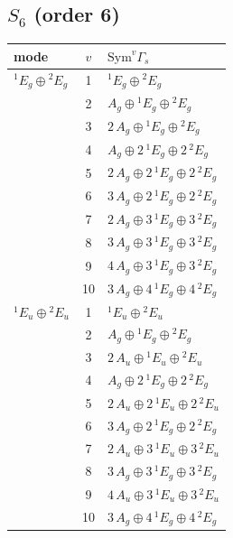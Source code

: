 \documentclass[11pt]{article}
\begin{document}
\subsection*{$S_{6}$ \quad (order 6)}
\begin{longtable}{l c p{}}
\hline mode & $v$ & $\mathrm{Sym}^v\Gamma_s$\\ \hline\endhead
${}^{1}E_{g}\oplus {}^{2}E_{g}$ & 1 & ${}^{1}E_{g}\oplus {}^{2}E_{g}$\\
 & 2 & $A_{g}\oplus {}^{1}E_{g}\oplus {}^{2}E_{g}$\\
 & 3 & $2\,A_{g}\oplus {}^{1}E_{g}\oplus {}^{2}E_{g}$\\
 & 4 & $A_{g}\oplus 2\,{}^{1}E_{g}\oplus 2\,{}^{2}E_{g}$\\
 & 5 & $2\,A_{g}\oplus 2\,{}^{1}E_{g}\oplus 2\,{}^{2}E_{g}$\\
 & 6 & $3\,A_{g}\oplus 2\,{}^{1}E_{g}\oplus 2\,{}^{2}E_{g}$\\
 & 7 & $2\,A_{g}\oplus 3\,{}^{1}E_{g}\oplus 3\,{}^{2}E_{g}$\\
 & 8 & $3\,A_{g}\oplus 3\,{}^{1}E_{g}\oplus 3\,{}^{2}E_{g}$\\
 & 9 & $4\,A_{g}\oplus 3\,{}^{1}E_{g}\oplus 3\,{}^{2}E_{g}$\\
 & 10 & $3\,A_{g}\oplus 4\,{}^{1}E_{g}\oplus 4\,{}^{2}E_{g}$\\
\hline
${}^{1}E_{u}\oplus {}^{2}E_{u}$ & 1 & ${}^{1}E_{u}\oplus {}^{2}E_{u}$\\
 & 2 & $A_{g}\oplus {}^{1}E_{g}\oplus {}^{2}E_{g}$\\
 & 3 & $2\,A_{u}\oplus {}^{1}E_{u}\oplus {}^{2}E_{u}$\\
 & 4 & $A_{g}\oplus 2\,{}^{1}E_{g}\oplus 2\,{}^{2}E_{g}$\\
 & 5 & $2\,A_{u}\oplus 2\,{}^{1}E_{u}\oplus 2\,{}^{2}E_{u}$\\
 & 6 & $3\,A_{g}\oplus 2\,{}^{1}E_{g}\oplus 2\,{}^{2}E_{g}$\\
 & 7 & $2\,A_{u}\oplus 3\,{}^{1}E_{u}\oplus 3\,{}^{2}E_{u}$\\
 & 8 & $3\,A_{g}\oplus 3\,{}^{1}E_{g}\oplus 3\,{}^{2}E_{g}$\\
 & 9 & $4\,A_{u}\oplus 3\,{}^{1}E_{u}\oplus 3\,{}^{2}E_{u}$\\
 & 10 & $3\,A_{g}\oplus 4\,{}^{1}E_{g}\oplus 4\,{}^{2}E_{g}$\\
\hline
\end{longtable}
\end{document}
